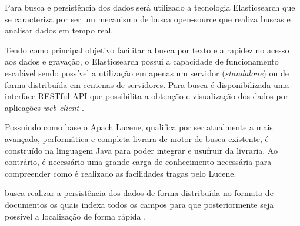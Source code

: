 Para busca e persistência dos dados será utilizado a tecnologia Elasticsearch que se caracteriza por ser um mecanismo de busca open-source que realiza buscas e analisar dados em tempo real.

Tendo como principal objetivo facilitar a busca por texto e a rapidez no acesso aos dados e gravação, o Elasticsearch possui a capacidade de funcionamento escalável sendo possível a utilização em apenas um servidor (\textit{standalone}) ou de forma distribuída em centenas de servidores.  Para busca é disponibilizada uma interface RESTful API que possibilita a obtenção e visualização dos dados por aplicações \textit{web client} \cite{Gormley:2015}.

Possuindo como base o Apach Lucene, qualifica por ser atualmente a mais avançado, performática e completa livrara de motor de busca existente, é construído na linguagem Java para poder integrar e usufruir da livraria. Ao contrário, é necessário uma grande carga de conhecimento necessária para compreender como é realizado as facilidades tragas pelo Lucene.

busca realizar a persistência dos dados de forma distribuída no formato de documentos os quais indexa todos os campos para que posteriormente seja possível a localização de forma rápida \cite{Gormley:2015}. 
